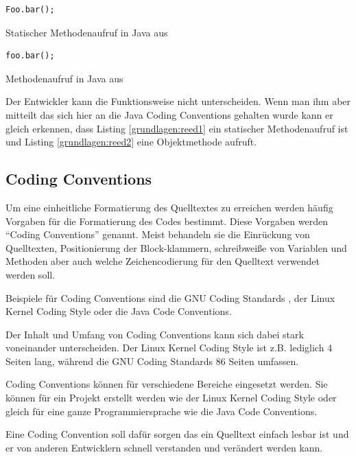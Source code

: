 \begin{listing}
    \begin{verbatim}
Foo.bar();
    \end{verbatim}
    \caption{Statischer Methodenaufruf in Java aus \cite[S. 182]{reed}}
    \label{grundlagen:reed1}
\end{listing}

\begin{listing}
    \begin{verbatim}
foo.bar();
    \end{verbatim}
    \caption{Methodenaufruf in Java aus \cite[S. 182]{reed}}
    \label{grundlagen:reed2}
\end{listing}

Der Entwickler kann die Funktionsweise nicht unterscheiden.
Wenn man ihm aber mitteilt das sich hier an die Java Coding Conventions gehalten wurde kann er gleich erkennen,
dass Listing \ref{grundlagen:reed1} ein statischer Methodenaufruf ist und
Listing \ref{grundlagen:reed2} eine Objektmethode aufruft.



\subsection{Coding Conventions}

Um eine einheitliche Formatierung des Quelltextes zu erreichen werden häufig
Vorgaben für die Formatierung des Codes bestimmt. Diese Vorgaben werden
\enquote{Coding Conventions} genannt. Meist behandeln sie die Einrückung von Quelltexten,
Positionierung der Block-klammern, schreibweiße von Variablen und Methoden aber auch
welche Zeichencodierung für den Quelltext verwendet werden soll.

Beispiele für Coding Conventions sind die GNU Coding Standards \cite{GNUCode},
der Linux Kernel Coding Style\cite{KernelCode} oder die Java Code Conventions\cite{javacode}.

Der Inhalt und Umfang von Coding Conventions kann sich dabei stark voneinander
unterscheiden. Der Linux Kernel Coding Style ist z.B. lediglich 4 Seiten lang,
während die GNU Coding Standards 86 Seiten umfassen.

Coding Conventions können für verschiedene Bereiche eingesetzt werden. Sie können für
ein Projekt erstellt werden wie der Linux Kernel Coding Style oder gleich für eine
ganze Programmiersprache wie die Java Code Conventions.

Eine Coding Convention soll dafür sorgen das ein Quelltext einfach lesbar ist
und er von anderen Entwicklern schnell verstanden und verändert werden kann.

